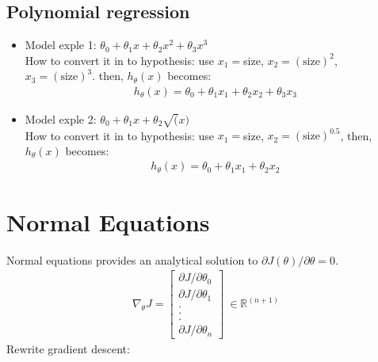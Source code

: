 \documentclass[a4paper,12pt]{report}
\begin{document}
\subsection{Polynomial regression}

\begin{itemize}
\item Model exple 1: $\theta_0 + \theta_1 x + \theta_2 x^2 + \theta_3 x^3$ \\
How to convert it in to hypothesis: use $x_1=$size, $x_2= (\mathrm{size})^2$, $x_3= (\mathrm{size})^3$. then, $h_{\theta}(x)$ becomes:
\begin{align*}
			h_{\theta}(x) = \theta_0 + \theta_1 x_1 + \theta_2 x_2 + \theta_3 x_3
\end{align*}

\item Model exple 2: $\theta_0 + \theta_1 x + \theta_2 \sqrt(x) $\\
How to convert it in to hypothesis: use $x_1=$size, $x_2= (\mathrm{size})^0.5$, then, $h_{\theta}(x)$ becomes:
\begin{align*}
			h_{\theta}(x) = \theta_0 + \theta_1 x_1 + \theta_2 x_2
\end{align*}
\end{itemize}

\section{Normal Equations}
Normal equations provides an analytical solution to $\partial J(\theta)/ \partial \theta = 0$.
\begin{align*}
			\nabla _{\theta} J = 	\begin{bmatrix} \partial J / \partial \theta_0 \\ \partial J / \partial \theta_1\\ .\\ . \\ . \\\partial J / \partial \theta_n \end{bmatrix} \ \in \mathbb{R}^{(n+1)}
\end{align*}
Rewrite gradient descent:\\
\\
\\
\end{document}
